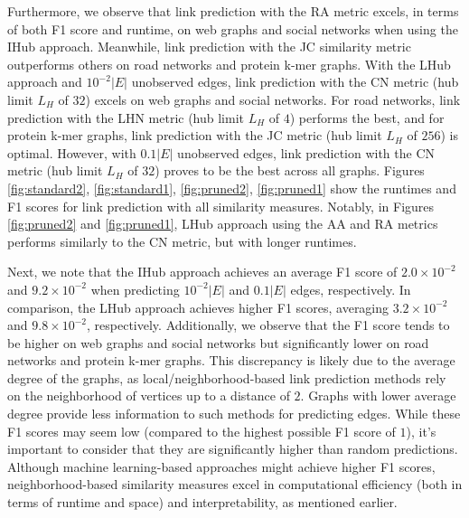 Furthermore, we observe that link prediction with the RA metric excels, in terms of both F1 score and runtime, on web graphs and social networks when using the IHub approach. Meanwhile, link prediction with the JC similarity metric outperforms others on road networks and protein k-mer graphs. With the LHub approach and $10^{-2}|E|$ unobserved edges, link prediction with the CN metric (hub limit $L_H$ of $32$) excels on web graphs and social networks. For road networks, link prediction with the LHN metric (hub limit $L_H$ of $4$) performs the best, and for protein k-mer graphs, link prediction with the JC metric (hub limit $L_H$ of $256$) is optimal. However, with $0.1|E|$ unobserved edges, link prediction with the CN metric (hub limit $L_H$ of $32$) proves to be the best across all graphs. Figures \ref{fig:standard2}, \ref{fig:standard1}, \ref{fig:pruned2}, \ref{fig:pruned1} show the runtimes and F1 scores for link prediction with all similarity measures. Notably, in Figures \ref{fig:pruned2} and \ref{fig:pruned1}, LHub approach using the AA and RA metrics performs similarly to the CN metric, but with longer runtimes.

Next, we note that the IHub approach achieves an average F1 score of $2.0\times10^{-2}$ and $9.2\times10^{-2}$ when predicting $10^{-2}|E|$ and $0.1|E|$ edges, respectively. In comparison, the LHub approach achieves higher F1 scores, averaging $3.2\times10^{-2}$ and $9.8\times10^{-2}$, respectively. Additionally, we observe that the F1 score tends to be higher on web graphs and social networks but significantly lower on road networks and protein k-mer graphs. This discrepancy is likely due to the average degree of the graphs, as local/neighborhood-based link prediction methods rely on the neighborhood of vertices up to a distance of $2$. Graphs with lower average degree provide less information to such methods for predicting edges. While these F1 scores may seem low (compared to the highest possible F1 score of $1$), it's important to consider that they are significantly higher than random predictions. Although machine learning-based approaches might achieve higher F1 scores, neighborhood-based similarity measures excel in computational efficiency (both in terms of runtime and space) and interpretability, as mentioned earlier.





